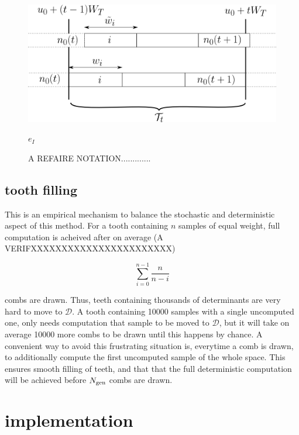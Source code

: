 \documentclass[./thesis.tex]{subfiles}
\begin{document}
 \begin{figure}[h!]
	\begin{center}
		\includegraphics[width=0.9\columnwidth]{figures/pt2/toothbuilding}
		\caption{A REFAIRE NOTATION.............}
		\label{fig:toothbuilding}
		$e_I$
	\end{center}
\end{figure}





\subsection*{tooth filling}

This is an empirical mechanism to balance the stochastic and deterministic aspect of this method. For a tooth containing $n$ samples of equal weight, full computation is acheived after on average (A VERIFXXXXXXXXXXXXXXXXXXXXXXX)

\begin{equation}
\sum_{i=0}^{n-1} \frac{n}{n-i}
\end{equation}

combs are drawn. Thus, teeth containing thousands of determinants are very hard to move to $\mathcal{D}$. A tooth containing 10000 samples with a single uncomputed one, only needs computation that sample to be moved to $\mathcal{D}$, but it will take on average 10000 more combs to be drawn until this happens by chance.
A convenient way to avoid this frustrating situation is, everytime a comb is drawn, to additionally compute the first uncomputed sample of the whole space. This ensures smooth filling of teeth, and that that the full deterministic computation will be achieved before ${N_\text{gen}}$ combs are drawn.

\section{implementation}
\end{document}
